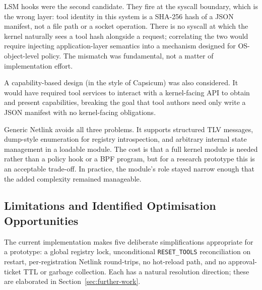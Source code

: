 LSM hooks were the second candidate.
They fire at the syscall boundary, which is the wrong layer: tool identity in this system is a SHA-256 hash of a JSON manifest, not a file path or a socket operation.
There is no syscall at which the kernel naturally sees a tool hash alongside a request; correlating the two would require injecting application-layer semantics into a mechanism designed for OS-object-level policy.
The mismatch was fundamental, not a matter of implementation effort.

A capability-based design (in the style of Capsicum) was also considered.
It would have required tool services to interact with a kernel-facing API to obtain and present capabilities, breaking the goal that tool authors need only write a JSON manifest with no kernel-facing obligations.

Generic Netlink avoids all three problems.
It supports structured TLV messages, dump-style enumeration for registry introspection, and arbitrary internal state management in a loadable module.
The cost is that a full kernel module is needed rather than a policy hook or a BPF program, but for a research prototype this is an acceptable trade-off. In practice, the module's role stayed narrow enough that the added complexity remained manageable.



\subsection{Limitations and Identified Optimisation Opportunities}

The current implementation makes five deliberate simplifications appropriate for a prototype: a global registry lock, unconditional \texttt{RESET\_TOOLS} reconciliation on restart, per-registration Netlink round-trips, no hot-reload path, and no approval-ticket TTL or garbage collection.
Each has a natural resolution direction; these are elaborated in Section~\ref{sec:further-work}.
